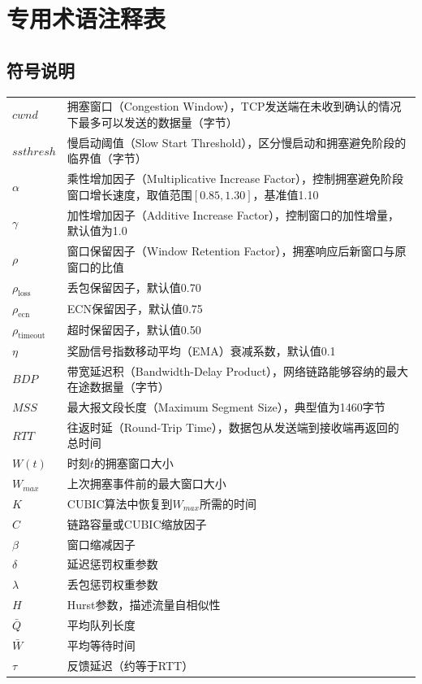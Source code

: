 \chapter*{专用术语注释表}

\section*{符号说明}
\begin{supertabular}{p{3cm}p{10cm}}
$cwnd$ & 拥塞窗口（Congestion Window），TCP发送端在未收到确认的情况下最多可以发送的数据量（字节） \\
$ssthresh$ & 慢启动阈值（Slow Start Threshold），区分慢启动和拥塞避免阶段的临界值（字节） \\
$\alpha$ & 乘性增加因子（Multiplicative Increase Factor），控制拥塞避免阶段窗口增长速度，取值范围$[0.85, 1.30]$，基准值1.10 \\
$\gamma$ & 加性增加因子（Additive Increase Factor），控制窗口的加性增量，默认值为1.0 \\
$\rho$ & 窗口保留因子（Window Retention Factor），拥塞响应后新窗口与原窗口的比值 \\
$\rho_{\text{loss}}$ & 丢包保留因子，默认值0.70 \\
$\rho_{\text{ecn}}$ & ECN保留因子，默认值0.75 \\
$\rho_{\text{timeout}}$ & 超时保留因子，默认值0.50 \\
$\eta$ & 奖励信号指数移动平均（EMA）衰减系数，默认值0.1 \\
$BDP$ & 带宽延迟积（Bandwidth-Delay Product），网络链路能够容纳的最大在途数据量（字节） \\
$MSS$ & 最大报文段长度（Maximum Segment Size），典型值为1460字节 \\
$RTT$ & 往返时延（Round-Trip Time），数据包从发送端到接收端再返回的总时间 \\
$W(t)$ & 时刻$t$的拥塞窗口大小 \\
$W_{max}$ & 上次拥塞事件前的最大窗口大小 \\
$K$ & CUBIC算法中恢复到$W_{max}$所需的时间 \\
$C$ & 链路容量或CUBIC缩放因子 \\
$\beta$ & 窗口缩减因子 \\
$\delta$ & 延迟惩罚权重参数 \\
$\lambda$ & 丢包惩罚权重参数 \\
$H$ & Hurst参数，描述流量自相似性 \\
$\bar{Q}$ & 平均队列长度 \\
$\bar{W}$ & 平均等待时间 \\
$\tau$ & 反馈延迟（约等于RTT） \\
\end{supertabular}

